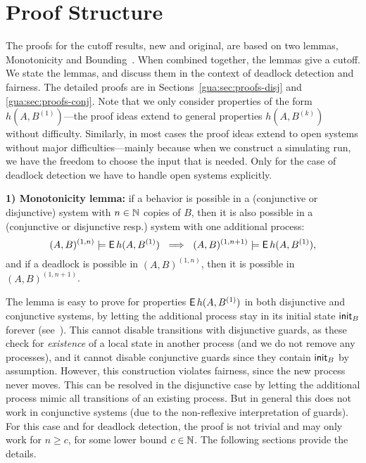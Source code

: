 \section{Proof Structure}\label{gua:sec:proof-structure}

The proofs for the cutoff results, new and original,
are based on two lemmas, Monotonicity and Bounding~\cite{Emerson00}.
When combined together, the lemmas give a cutoff.
We state the lemmas, and discuss them in the context of deadlock detection and fairness.
The detailed proofs are in Sections~\ref{gua:sec:proofs-disj} and \ref{gua:sec:proofs-conj}.
Note that we only consider properties of the form $h(A,B^{(1)})$---the
proof ideas extend to general properties $h(A,B^{(k)})$ without difficulty.
Similarly, in most cases the proof ideas extend to open systems
without major difficulties---mainly because when we construct a simulating
run, we have the freedom to choose the input that is needed.
Only for the case of deadlock detection we have to handle open systems explicitly.

\smallskip
\noindent
{\bf 1) Monotonicity lemma:} if a behavior is possible in a (conjunctive or disjunctive) system with $n \in \mathbb{N}$ copies of $B$,
then it is also possible in a (conjunctive or disjunctive resp.) system with one additional process:
\[
(A,B)^{(1,n)} \models \operatorname{\mathsf{E}} h(A,B^{(1)}) 
~\implies~
(A,B)^{(1, n+1)} \models \operatorname{\mathsf{E}} h(A,B^{(1)}), 
\]
and if a deadlock is possible in $(A,B)^{(1, n)}$, then it is possible in $(A,B)^{(1, n+1)}$.
%

The lemma is easy to prove for properties 
$\operatorname{\mathsf{E}} h(A,B^{(1)})$ in both disjunctive and conjunctive systems, by letting the 
additional process stay in its initial state ${\sf init}_B$ forever (see~\cite{Emerson00}).
This cannot disable transitions with disjunctive guards, as
these check for \emph{existence} of a local state in another process (and we 
do not remove any processes), and it cannot disable conjunctive guards since 
they contain ${\sf init}_B$ by assumption. 
However, this construction violates fairness, since the new process
never moves. This can be resolved in the disjunctive case by letting the
additional process mimic all transitions of an existing process. But in
general this does not work in conjunctive systems (due to the non-reflexive
interpretation of guards).
For this case and for deadlock detection, the proof is not
trivial and may only work for $n \geq c$, for some lower bound $c \in \mathbb{N}$.
The following sections provide the details.



